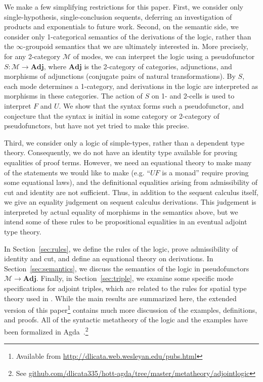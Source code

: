 \documentclass{drl-common/llncs}
\newcommand{\M}{\ensuremath{\mathcal{M}}}
\newcommand{\Adj}{\textbf{Adj}}
\begin{document}
We make a few simplifying restrictions for this paper. First, we
consider only single-hypothesis, single-conclusion sequents, deferring
an investigation of products and exponentials to future work.
Second, on the semantic side, we consider only 1-categorical semantics
of the derivations of the logic, rather than the $\infty$-groupoid
semantics that we are ultimately interested in.  More precisely, for any
2-category \M\/ of modes, we can interpret the logic using a
pseudofunctor $S : \M \to \Adj$, where $\Adj$ is the 2-category of
categories, adjunctions, and morphisms of adjunctions (conjugate pairs
of natural transformations).  By $S$, each mode determines a 1-category,
and derivations in the logic are interpreted as morphisms in these
categories.  The action of $S$ on 1- and 2-cells is used to interpret
$F$ and $U$.  We show that the syntax forms such a pseudofunctor, and
conjecture that the syntax is initial in some category or 2-category of
pseudofunctors, but have not yet tried to make this precise.

Third, we consider only a logic of simple-types, rather than a dependent
type theory.  Consequently, we do not have an identity type available
for proving equalities of proof terms.  However, we need an equational
theory to make many of the statements we would like to make (e.g. ``$UF$ is a monad''
require proving some equational laws), and the definitional equalities
arising from admissibility of cut and identity are not sufficient.
Thus, in addition to the sequent calculus itself, we give an equality
judgement on sequent calculus derivations.  This judgement is
interpreted by actual equality of morphisms in the semantics above, but
we intend some of these rules to be propositional equalities in an eventual
adjoint type theory.

In Section~\ref{sec:rules}, we define the rules of the logic, prove
admissibility of identity and cut, and define an equational theory on
derivations.  In Section~\ref{sec:semantics}, we discuss the semantics of
the logic in pseudofunctors $\M \to \Adj$.  Finally, in
Section~\ref{sec:triple}, we examine some specific mode specifications
for adjoint triples, which are related to the rules for spatial type
theory used in \citep{shulman15realcohesion}.  While the main results
are summarized here, the extended version of this
paper\footnote{Available from
  \url{http://dlicata.web.wesleyan.edu/pubs.html}}  contains much more
discussion of the examples, definitions, and proofs.  All of the
syntactic metatheory of the logic and the examples have been formalized
in Agda~\citep{norell07thesis}.\footnote{See
  \url{github.com/dlicata335/hott-agda/tree/master/metatheory/adjointlogic}}
\end{document}
